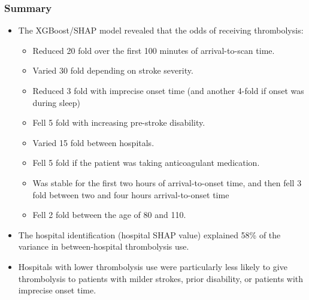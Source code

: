 
\begin{frame}
\frametitle{Summary}
\small

\begin{itemize}
    \item The XGBoost/SHAP model revealed that the odds of receiving thrombolysis:
    
    \begin{itemize}
        \scriptsize
        \item Reduced 20 fold over the first 100 minutes of arrival-to-scan time.
        \item Varied 30 fold depending on stroke severity.
        \item Reduced 3 fold with imprecise onset time (and another 4-fold if onset was during sleep)
        \item Fell 5 fold with increasing pre-stroke disability.
        \item Varied 15 fold between hospitals. 
        \item Fell 5 fold if the patient was taking anticoagulant medication.
        \item Was stable for the first two hours of arrival-to-onset time, and then fell 3 fold between two and four hours arrival-to-onset time
        \item Fell 2 fold between the age of 80 and 110.
    \end{itemize}

\small
\item The hospital identification (hospital SHAP value) explained 58\% of the variance in between-hospital thrombolysis use. 

\item Hospitals with lower thrombolysis use were particularly less likely to give thrombolysis to patients with milder strokes, prior disability, or patients with imprecise onset time.

\end{itemize}

\end{frame}

